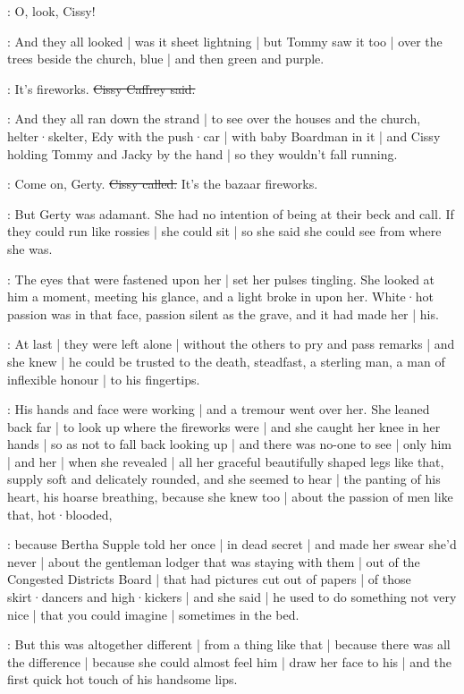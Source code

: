 \jacky:
O,
look,
Cissy!

:
And they all looked |
was it sheet lightning |%
but Tommy saw it too |
over the trees beside the church,
blue |
and then green
and purple.

\cissy:
It's fireworks.
\sout{Cissy Caffrey said.}

:
And they all ran down the strand |
to see over the houses
and the church,
helter·skelter,
Edy with the push·car |
with baby Boardman in it |
and Cissy holding Tommy and Jacky by the hand |
so they wouldn't fall running.

\cissy:
Come on,
Gerty.
\sout{Cissy called.}
It's the bazaar fireworks.

\gertyReal:
But Gerty was adamant.
She had no intention
of being at their beck and call.
If they could run like rossies |
she could sit |
so she said she could see
from where she was.

\gertySex:
The eyes that were fastened upon her |
set her pulses tingling.%
She looked at him a moment,
meeting his glance,
and a light broke in upon her.
White·hot passion was in that face,
passion silent as the grave,
and it had made her |
his.

\gertyNovel:
At last |
they were left alone |
without the others to pry and pass remarks |
and she knew |
he could be trusted to the death,
steadfast,
a sterling man,
a man of inflexible honour |
to his fingertips.

\gertySex:
His hands and face were working |
and a tremour went over her.
She leaned back far |
to look up
where the fireworks were |
and she caught her knee in her hands |
so as not to fall back looking up |
and there was no-one to see |
only him |
and her |
when she revealed |
all her graceful beautifully shaped legs like that,
supply soft and delicately rounded,
and she seemed to hear |
the panting of his heart,
his hoarse breathing,%
because she knew too |
about the passion of men like that,
hot·blooded,

\gertyJudgy:
because Bertha Supple told her once |
in dead secret |
and made her swear she'd never |
about the gentleman lodger that was staying with them |
out of the Congested Districts Board |
that had pictures cut out of papers |
of those skirt·dancers and high·kickers |
and she said |
he used to do something not very nice |
that you could imagine |
sometimes in the bed.

\gertySex:
But this was altogether different |
from a thing like that |
because there was all the difference |
because she could almost feel him |
draw her face to his |
and the first quick hot touch
of his handsome lips.

